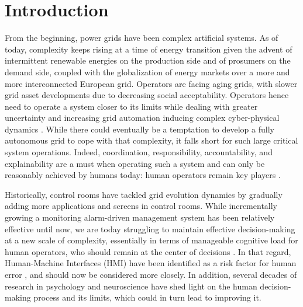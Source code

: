 \documentclass{IOS-Book-Article}
\begin{document}
\section{Introduction}

From the beginning, power grids have been complex artificial systems. As of today, complexity keeps rising at a time of energy transition given the advent of intermittent renewable energies on the production side and of prosumers on the demand side, coupled with the globalization of energy markets over a more and more interconnected European grid. Operators are facing aging grids, with slower grid asset developments due to decreasing social acceptability. Operators hence need to operate a system closer to its limits while dealing with greater uncertainty and increasing grid automation \cite{marot2022perspectives} inducing complex cyber-physical dynamics \cite{allgoewer2019position}. 
While there could eventually be a temptation to develop a fully autonomous grid to cope with that complexity, it falls short for such large critical system operations. Indeed, coordination, responsibility, accountability, and explainability are a must when operating such a system and can only be reasonably achieved by humans today: human operators remain key players \cite{prostejovsky2019future}.


Historically, control rooms have tackled grid evolution dynamics by gradually adding more applications and screens in control rooms. While incrementally growing a monitoring alarm-driven management system has been relatively effective until now, we are today struggling to maintain effective decision-making at a new scale of complexity, essentially in terms of manageable cognitive load for human operators, who should remain at the center of decisions \cite{marot2022perspectives}. In that regard, Human-Machine Interfaces (HMI) have been identified as a risk factor for human error \cite{flaspoler2009human}, and should now be considered more closely. In addition, several decades of research in psychology \cite{kahneman2011thinking} and neuroscience \cite{naccache2005effortless} have shed light on the human decision-making process and its limits, which could in turn lead to improving it.
\end{document}
